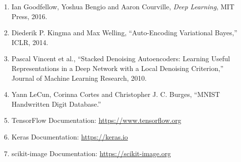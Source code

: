 \documentclass[10pt]{article}
\begin{document}
\begin{enumerate}
\item Ian Goodfellow, Yoshua Bengio and Aaron Courville,
\emph{Deep Learning}, MIT Press, 2016.

\item Diederik P. Kingma and Max Welling,
``Auto-Encoding Variational Bayes,'' ICLR, 2014.

\item Pascal Vincent et al.,
``Stacked Denoising Autoencoders: Learning Useful Representations in a Deep
Network with a Local Denoising Criterion,'' Journal of Machine Learning
Research, 2010.

\item Yann LeCun, Corinna Cortes and Christopher J. C. Burges,
``MNIST Handwritten Digit Database.''

\item TensorFlow Documentation:
\url{https://www.tensorflow.org}

\item Keras Documentation:
\url{https://keras.io}

\item scikit-image Documentation:
\url{https://scikit-image.org}
\end{enumerate}
\end{document}
